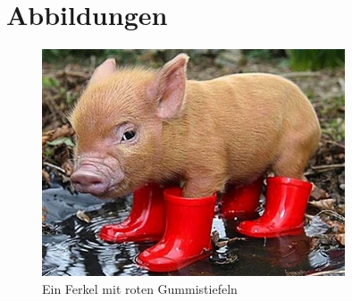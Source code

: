 \section{Abbildungen}

\begin{figure}[htbp]
                \centering
                \includegraphics[width=0.8\textwidth]{graphics/raster/pig.jpg}
        \caption[Ferkel]{Ein Ferkel mit roten Gummistiefeln}
        \label{fig:ferkel}
\end{figure}